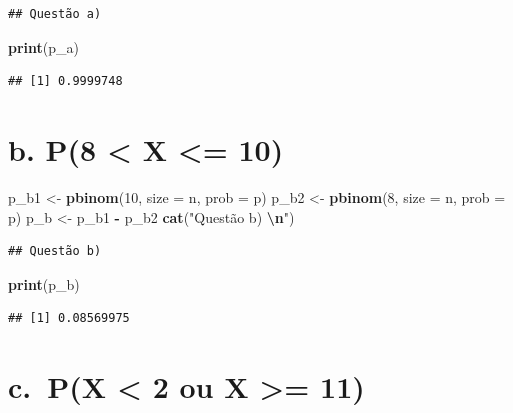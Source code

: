 \documentclass[
]{article}
\newenvironment{Shaded}{\begin{snugshade}}{\end{snugshade}}
\newcommand{\AttributeTok}[1]{\textcolor[rgb]{0.13,0.29,0.53}{#1}}
\newcommand{\DecValTok}[1]{\textcolor[rgb]{0.00,0.00,0.81}{#1}}
\newcommand{\FunctionTok}[1]{\textcolor[rgb]{0.13,0.29,0.53}{\textbf{#1}}}
\newcommand{\NormalTok}[1]{#1}
\newcommand{\OtherTok}[1]{\textcolor[rgb]{0.56,0.35,0.01}{#1}}
\newcommand{\SpecialCharTok}[1]{\textcolor[rgb]{0.81,0.36,0.00}{\textbf{#1}}}
\newcommand{\StringTok}[1]{\textcolor[rgb]{0.31,0.60,0.02}{#1}}
\begin{document}
\begin{verbatim}
## Questão a)
\end{verbatim}

\begin{Shaded}
\begin{Highlighting}[]
\FunctionTok{print}\NormalTok{(p\_a)}
\end{Highlighting}
\end{Shaded}

\begin{verbatim}
## [1] 0.9999748
\end{verbatim}

\section{b. P(8 \textless{} X \textless= 10)}\label{b.-p8-x-10}

\begin{Shaded}
\begin{Highlighting}[]
\NormalTok{p\_b1 }\OtherTok{\textless{}{-}} \FunctionTok{pbinom}\NormalTok{(}\DecValTok{10}\NormalTok{, }\AttributeTok{size =}\NormalTok{ n, }\AttributeTok{prob =}\NormalTok{ p)}
\NormalTok{p\_b2 }\OtherTok{\textless{}{-}} \FunctionTok{pbinom}\NormalTok{(}\DecValTok{8}\NormalTok{, }\AttributeTok{size =}\NormalTok{ n, }\AttributeTok{prob =}\NormalTok{ p)}
\NormalTok{p\_b }\OtherTok{\textless{}{-}}\NormalTok{ p\_b1 }\SpecialCharTok{{-}}\NormalTok{ p\_b2}
\FunctionTok{cat}\NormalTok{(}\StringTok{"Questão b) }\SpecialCharTok{\textbackslash{}n}\StringTok{"}\NormalTok{)}
\end{Highlighting}
\end{Shaded}

\begin{verbatim}
## Questão b)
\end{verbatim}

\begin{Shaded}
\begin{Highlighting}[]
\FunctionTok{print}\NormalTok{(p\_b)}
\end{Highlighting}
\end{Shaded}

\begin{verbatim}
## [1] 0.08569975
\end{verbatim}

\section{c.~P(X \textless{} 2 ou X \textgreater=
11)}\label{c.-px-2-ou-x-11}
\end{document}
